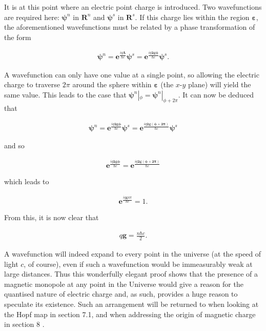 \documentclass[fleqn, twocolumn, 10pt]{article}
\begin{document}
It is at this point where an electric point charge is introduced. Two wavefunctions are required here: $\bm{\psi}^n$ in $\bm{R}^n$ and $\bm{\psi}^s$ in $\bm{R}^s$. If this charge lies within the region $\bm{\varepsilon}$, the aforementioned wavefunctions must be related by a phase transformation of the form

\begin{ceqn}
\begin{align*}
\bm{\psi}^n = \bm{e}^\frac{iq\bm{\Lambda}}{\hbar c}\bm{\psi}^s = \bm{e}^\frac{iq\bm{2\bm{g}\phi}}{\hbar c}\bm{\psi}^s.
\end{align*}
\end{ceqn}
A wavefunction can only have one value at a single point, so allowing the electric charge to traverse $2\pi$ around the sphere within $\bm{\varepsilon}$ (the $x$-$y$ plane) will yield the same value. This leads to the case that $\bm{\psi}^n|_\phi = \bm{\psi}^n|_{\phi+2\pi}$. It can now be deduced that 

\begin{ceqn}
\begin{align*}
\bm{\psi}^n = \bm{e}^\frac{iq\bm{2\bm{g}\phi}}{\hbar c}\bm{\psi}^s = \bm{e}^\frac{iq\bm{2\bm{g}(\phi+2\pi)}}{\hbar c}\bm{\psi}^s
\end{align*}
\end{ceqn}
and so

\begin{ceqn}
\begin{align*}
\bm{e}^\frac{iq\bm{2\bm{g}\phi}}{\hbar c} = \bm{e}^\frac{iq\bm{2\bm{g}(\phi+2\pi)}}{\hbar c}
\end{align*}
\end{ceqn}
which leads to

\begin{ceqn}
\begin{align*}
\bm{e}^\frac{iq\bm{g}4\pi}{\hbar c} = 1.
\end{align*}
\end{ceqn}
From this, it is now clear that 

\begin{ceqn}
\begin{align*}
q\bm{g} = \frac{n\hbar c}{2}.
\end{align*}
\end{ceqn}

A wavefunction will indeed expand to every point in the universe (at the speed of light $c$, of course), even if such a wavefunction would be immeasurably weak at large distances. Thus this wonderfully elegant proof shows that the presence of a magnetic monopole at any point in the Universe would give a reason for the quantised nature of electric charge and, as such, provides a huge reason to speculate its existence. Such an arrangement will be returned to when looking at the Hopf map in section 7.1, and when addressing the origin of magnetic charge in section 8 \cite{Heras_2018, shnir, preskill1984magnetic}.
\end{document}
